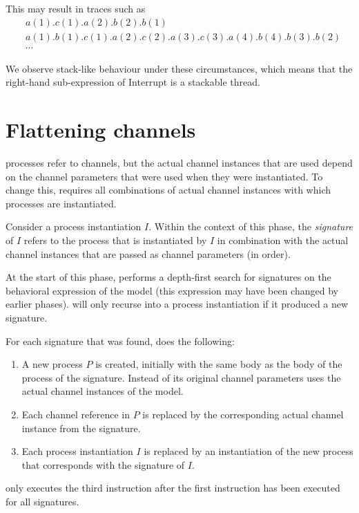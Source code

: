 This may result in traces such as
\begin{align*}
&a(1).c(1).a(2).b(2).b(1) \\
&a(1).b(1).c(1).a(2).c(2).a(3).c(3).a(4).b(4).b(3).b(2) \\
&\cdots{}
\end{align*}

We observe stack-like behaviour under these circumstances, which means that the right-hand sub-expression of Interrupt is a stackable thread.

\section{Flattening channels}

\txs{} processes refer to channels, but the actual channel instances that are used depend on the channel parameters that were used when they were instantiated.
To change this, \lpeq{} requires all combinations of actual channel instances with which processes are instantiated.

Consider a process instantiation $I$.
Within the context of this phase, the \emph{signature} of $I$ refers to the process that is instantiated by $I$ in combination with the actual channel instances that are passed as channel parameters (in order).

At the start of this phase, \lpeq{} performs a depth-first search for signatures on the behavioral expression of the model (this expression may have been changed by earlier phases).
\lpeq{} will only recurse into a process instantiation if it produced a new signature.

For each signature that was found, \lpeq{} does the following:
\begin{enumerate}[1.]
\item A new process $P$ is created, initially with the same body as the body of the process of the signature.
Instead of its original channel parameters \lpeq{} uses the actual channel instances of the model.
\item Each channel reference in $P$ is replaced by the corresponding actual channel instance from the signature.
\item Each process instantiation $I$ is replaced by an instantiation of the new process that corresponds with the signature of $I$.
\end{enumerate}

\lpeq{} only executes the third instruction after the first instruction has been executed for all signatures.

